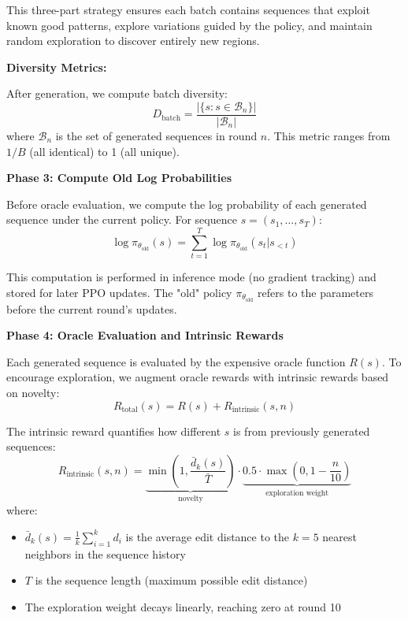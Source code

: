 \documentclass[conference]{IEEEtran}
\begin{document}
This three-part strategy ensures each batch contains sequences that exploit known good patterns, explore variations guided by the policy, and maintain random exploration to discover entirely new regions.

\textbf{Diversity Metrics:}

After generation, we compute batch diversity:
\begin{equation}
D_{\text{batch}} = \frac{|\{s : s \in \mathcal{B}_n\}|}{|\mathcal{B}_n|}
\end{equation}
where $\mathcal{B}_n$ is the set of generated sequences in round $n$. This metric ranges from $1/B$ (all identical) to 1 (all unique).

\textbf{Phase 3: Compute Old Log Probabilities}

Before oracle evaluation, we compute the log probability of each generated sequence under the current policy. For sequence $s = (s_1, \ldots, s_T)$:
\begin{equation}
\log \pi_{\theta_{\text{old}}}(s) = \sum_{t=1}^{T} \log \pi_{\theta_{\text{old}}}(s_t | s_{<t})
\end{equation}

This computation is performed in inference mode (no gradient tracking) and stored for later PPO updates. The "old" policy $\pi_{\theta_{\text{old}}}$ refers to the parameters before the current round's updates.

\textbf{Phase 4: Oracle Evaluation and Intrinsic Rewards}

Each generated sequence is evaluated by the expensive oracle function $R(s)$. To encourage exploration, we augment oracle rewards with intrinsic rewards based on novelty:
\begin{equation}
R_{\text{total}}(s) = R(s) + R_{\text{intrinsic}}(s, n)
\end{equation}

The intrinsic reward quantifies how different $s$ is from previously generated sequences:
\begin{equation}
R_{\text{intrinsic}}(s, n) = \underbrace{\min\left(1, \frac{\bar{d}_k(s)}{\bar{T}}\right)}_{\text{novelty}} \cdot \underbrace{0.5 \cdot \max\left(0, 1 - \frac{n}{10}\right)}_{\text{exploration weight}}
\end{equation}
where:
\begin{itemize}
    \item $\bar{d}_k(s) = \frac{1}{k}\sum_{i=1}^{k} d_i$ is the average edit distance to the $k = 5$ nearest neighbors in the sequence history
    \item $T$ is the sequence length (maximum possible edit distance)
    \item The exploration weight decays linearly, reaching zero at round 10
\end{itemize}
\end{document}
